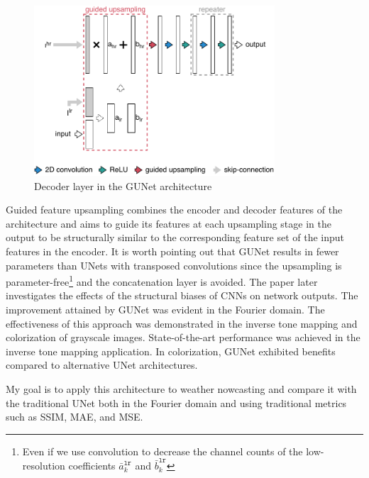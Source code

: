 \begin{figure}[h]
    \centering
    \includegraphics[width=0.8\textwidth]{images/gunet_decoder.pdf}
    \caption[Decoder layer in the GUNet architecture]{\label{fig:gunet_decoder}Decoder layer in the GUNet architecture}
\end{figure}

Guided feature upsampling combines the encoder and decoder features of the architecture and aims to guide its features at each upsampling stage in the output to be structurally similar to the corresponding feature set of the input features in the encoder. It is worth pointing out that \gls{GUNet} results in fewer parameters than UNets with transposed convolutions since the upsampling is parameter-free\footnote{Even if we use convolution to decrease the channel counts of the low-resolution coefficients $\bar a_k^{\texttt{lr}}$ and $\bar b_k^{\texttt{lr}}$} and the concatenation layer is avoided. The paper \cite{gunet} later investigates the effects of the structural biases of \glspl{CNN} on network outputs. The improvement attained by \gls{GUNet} was evident in the Fourier domain. The effectiveness of this approach was demonstrated in the inverse tone mapping and colorization of grayscale images. State-of-the-art performance was achieved in the inverse tone mapping application. In colorization, \gls{GUNet} exhibited benefits compared to alternative UNet architectures. \cite{gunet}

My goal is to apply this architecture to weather nowcasting and compare it with the traditional UNet both in the Fourier domain and using traditional metrics such as \gls{SSIM}, \gls{MAE}, and \gls{MSE}.

